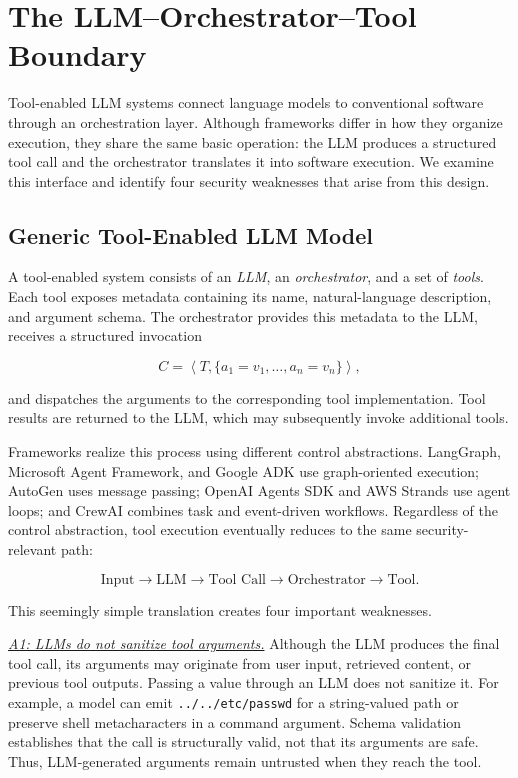 
\section{The LLM--Orchestrator--Tool Boundary}
\label{sec:trust-boundary}

Tool-enabled LLM systems connect language models to conventional software
through an orchestration layer. Although frameworks differ in how they
organize execution, they share the same basic operation: the LLM produces a
structured tool call and the orchestrator translates it into software
execution. We examine this interface and identify four security weaknesses
that arise from this design.

\subsection{Generic Tool-Enabled LLM Model}
\label{sec:tool-model}

A tool-enabled system consists of an \emph{LLM}, an \emph{orchestrator}, and a
set of \emph{tools}. Each tool exposes metadata containing its name,
natural-language description, and argument schema. The orchestrator provides
this metadata to the LLM, receives a structured invocation

\[
C=\left\langle T,\{a_1=v_1,\ldots,a_n=v_n\}\right\rangle,
\]

and dispatches the arguments to the corresponding tool implementation. Tool
results are returned to the LLM, which may subsequently invoke additional
tools.

Frameworks realize this process using different control abstractions.
LangGraph, Microsoft Agent Framework, and Google ADK use graph-oriented
execution; AutoGen uses message passing; OpenAI Agents SDK and AWS Strands use
agent loops; and CrewAI combines task and event-driven workflows. Regardless
of the control abstraction, tool execution eventually reduces to the same
security-relevant path:

\[
\text{Input}
\rightarrow
\text{LLM}
\rightarrow
\text{Tool Call}
\rightarrow
\text{Orchestrator}
\rightarrow
\text{Tool}.
\]

This seemingly simple translation creates four important weaknesses.

\medskip
\noindent\textit{\underline{A1: LLMs do not sanitize tool arguments.}}
Although the LLM produces the final tool call, its arguments may originate
from user input, retrieved content, or previous tool outputs. Passing a value
through an LLM does not sanitize it. For example, a model can emit
\texttt{../../etc/passwd} for a string-valued path or preserve shell
metacharacters in a command argument. Schema validation establishes that the
call is structurally valid, not that its arguments are safe. Thus,
LLM-generated arguments remain untrusted when they reach the tool.

